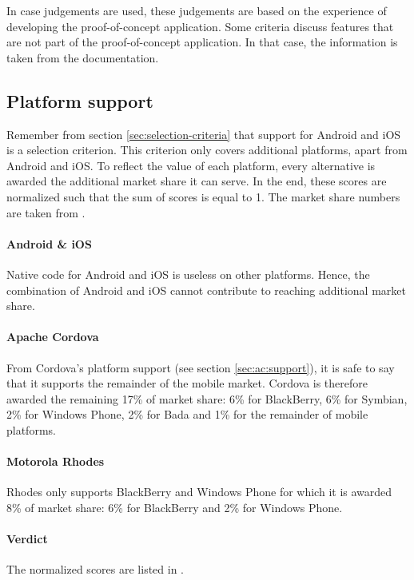 In case judgements are used, these judgements are based on the experience of developing the proof-of-concept application. Some criteria discuss features that are not part of the proof-of-concept application. In that case, the information is taken from the documentation. 

\subsection{Platform support}

Remember from section \ref{sec:selection-criteria} that support for Android and iOS is a selection criterion. This criterion only covers additional platforms, apart from Android and iOS. To reflect the value of each platform, every alternative is awarded the additional market share it can serve. In the end, these scores are normalized such that the sum of scores is equal to 1. The market share numbers are taken from .

\paragraph{Android \& iOS} Native code for Android and iOS is useless on other platforms. Hence, the combination of Android and iOS cannot contribute to reaching additional market share.

\paragraph{Apache Cordova} From Cordova's platform support (see section \ref{sec:ac:support}), it is safe to say that it supports the remainder of the mobile market. Cordova is therefore awarded the remaining 17\% of market share: 6\% for BlackBerry, 6\% for Symbian, 2\% for Windows Phone, 2\% for Bada and 1\% for the remainder of mobile platforms.

\paragraph{Motorola Rhodes} Rhodes only supports BlackBerry and Windows Phone for which it is awarded 8\% of market share: 6\% for BlackBerry and 2\% for Windows Phone. 

\paragraph{Verdict} The normalized scores are listed in . 

